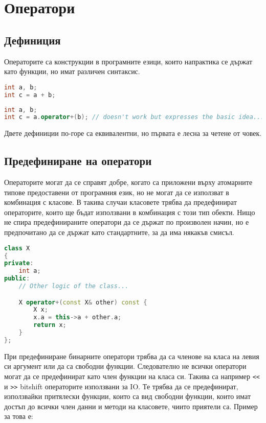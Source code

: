 \documentclass[fleqn,12pt]{article}
\begin{document}
\section{Оператори}
\subsection{Дефиниция}
Операторите са конструкции в програмните езици, които напрактика се държат като функции, но имат различен синтаксис. 

\begin{lstlisting}[language=C++, caption=Example use of operators]
int a, b;
int c = a + b;
\end{lstlisting}

\begin{lstlisting}[language=C++, caption=Equivalent use of operators]
int a, b;
int c = a.operator+(b); // doesn't work but expresses the basic idea...
\end{lstlisting}

Двете дефиниции по-горе са еквивалентни, но първата е лесна за четене от човек.


\subsection{Предефиниране на оператори}
Операторите могат да се справят добре, когато са приложени върху атомарните типове предоставени от програмния език, но не могат да се използват в комбинация с класове. В такива случаи класовете трябва да предефинират операторите, които ще бъдат използвани в комбинация с този тип обекти. Нищо не спира предефинираните оператори да се държат по произволен начин, но е предпочитано да се държат като стандартните, за да има някакъв смисъл.

\begin{lstlisting}[language=C++, caption=Example overriding of an operator]
class X
{
private:
    int a;
public:
    // Other logic of the class...

    X operator+(const X& other) const {
        X x;
        x.a = this->a + other.a;
        return x;
    }
};
\end{lstlisting}

При предефиниране бинарните оператори трябва да са членове на класа на левия си аргумент или да са свободни функции.
Следователно не всички оператори могат да се предефинират като член функции на класа си.
Такива са например \texttt{<<} и \texttt{>>} bitshift операторите използвани за IO.
Те трябва да се предефинират, използвайки притялески функции, които са вид свободни функции, които имат достъп до всички член данни и методи на класовете, чиито приятели са.
Пример за това е:
\end{document}
